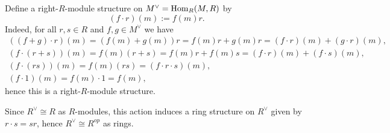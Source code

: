 \documentclass[../../master.tex]{subfiles}
\begin{document}
\begin{solution}
    Define a right-$R$-module structure on $M^{\vee} = \operatorname{Hom}_R(M, R)$ by
    \[
        (f \cdot r)(m) := f(m)r.
    \]
    Indeed, for all $r, s \in R$ and $f, g \in M ^{\vee}$ we have
    \begin{gather*}
        ((f + g) \cdot r)(m) = (f(m) + g(m)) r = f(m)r + g(m)r = (f \cdot r)(m) + (g \cdot r)(m), \\
        (f \cdot (r + s))(m) = f(m) (r + s) = f(m)r + f(m)s = (f \cdot r)(m) + (f \cdot s)(m), \\
        (f \cdot (rs))(m) = f(m) (rs) = (f \cdot r \cdot s)(m), \\
        (f \cdot 1)(m) = f(m) \cdot 1 = f(m),
    \end{gather*}
    hence this is a right-$R$-module structure.

    Since $R^{\vee} \cong R$ as $R$-modules, this action induces a ring structure on $R^{\vee}$ given by $r \cdot s = sr$, hence $R^{\vee} \cong R^{op}$ as rings.
\end{solution}
\end{document}
